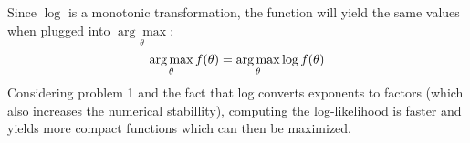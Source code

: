 Since $\log$ is a monotonic transformation, the function will yield the same values when plugged into $\underset{\theta}{\arg\max}$:
\[ \operatorname*{arg\,max}_\theta f(\theta) = \operatorname*{arg\,max}_\theta \log f(\theta) \]
Considering problem 1 and the fact that log converts exponents to factors (which also increases the numerical stabillity), computing the log-likelihood is faster and yields more compact functions which can then be maximized.

